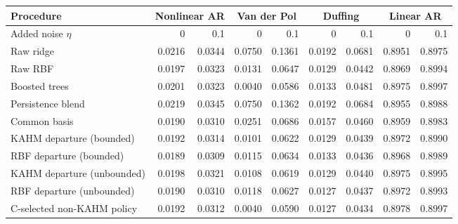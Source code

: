 \begin{tabular}{@{}lrrrrrrrr@{}}
\toprule
Procedure & \multicolumn{2}{c}{Nonlinear AR} & \multicolumn{2}{c}{Van der Pol} & \multicolumn{2}{c}{Duffing} & \multicolumn{2}{c}{Linear AR} \\
\midrule
Added noise $\eta$ & 0 & 0.1 & 0 & 0.1 & 0 & 0.1 & 0 & 0.1 \\
Raw ridge & 0.0216 & 0.0344 & 0.0750 & 0.1361 & 0.0192 & 0.0681 & 0.8951 & 0.8975 \\
Raw RBF & 0.0197 & 0.0323 & 0.0131 & 0.0647 & 0.0129 & 0.0442 & 0.8969 & 0.8994 \\
Boosted trees & 0.0201 & 0.0323 & 0.0040 & 0.0586 & 0.0133 & 0.0481 & 0.8975 & 0.8997 \\
Persistence blend & 0.0219 & 0.0345 & 0.0750 & 0.1362 & 0.0192 & 0.0684 & 0.8955 & 0.8988 \\
Common basis & 0.0190 & 0.0310 & 0.0251 & 0.0686 & 0.0157 & 0.0460 & 0.8959 & 0.8983 \\
KAHM departure (bounded) & 0.0192 & 0.0314 & 0.0101 & 0.0622 & 0.0129 & 0.0439 & 0.8972 & 0.8990 \\
RBF departure (bounded) & 0.0189 & 0.0309 & 0.0115 & 0.0634 & 0.0133 & 0.0436 & 0.8968 & 0.8989 \\
KAHM departure (unbounded) & 0.0198 & 0.0321 & 0.0108 & 0.0619 & 0.0129 & 0.0440 & 0.8975 & 0.8995 \\
RBF departure (unbounded) & 0.0190 & 0.0310 & 0.0118 & 0.0627 & 0.0127 & 0.0437 & 0.8972 & 0.8993 \\
C-selected non-KAHM policy & 0.0192 & 0.0312 & 0.0040 & 0.0590 & 0.0127 & 0.0434 & 0.8978 & 0.8997 \\
\bottomrule
\end{tabular}
